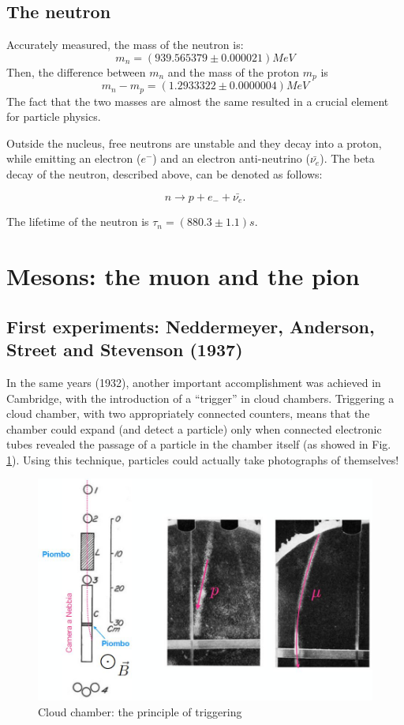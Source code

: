 \subsection{The neutron}
Accurately measured, the mass of the neutron is: 
\[m_n = (939.565379 \pm 0.000021) \si{MeV}\]
Then, the difference between $m_n$ and the mass of the proton $m_p$ is
\[m_n - m_p = (1.2933322 \pm 0.0000004) \si{MeV}\]
The fact that the two masses are almost the same resulted in a crucial element for particle physics.

Outside the nucleus, free neutrons are unstable and they decay into a proton, while emitting an electron ($e^{-}$) and an electron anti-neutrino ($\bar{\nu_e}$). The beta decay of the neutron, described above, can be denoted as follows:

\[ n \rightarrow p + e_{-} + \bar{\nu_e}.\]

The lifetime of the neutron is $\tau_n = (880.3 \pm 1.1) \si{s}$.

\section{Mesons: the muon and the pion}
\subsection{First experiments: Neddermeyer, Anderson, Street and Stevenson (1937) }
In the same years (1932), another important accomplishment was achieved in Cambridge, with the introduction of a ``trigger'' in cloud chambers. Triggering a cloud chamber, with two appropriately connected counters, means that the chamber could expand (and detect a particle) only when connected electronic tubes revealed the passage of a particle in the chamber itself (as showed in Fig. \ref{fig:trigger}). Using this technique, particles could actually take photographs of themselves!
 
\begin{figure}[!h]
    \centering
    \includegraphics[width=\textwidth]{Figures/FNSN18_1.JPG}
    \caption{Cloud chamber: the principle of triggering}
    \label{fig:trigger}
\end{figure} 

